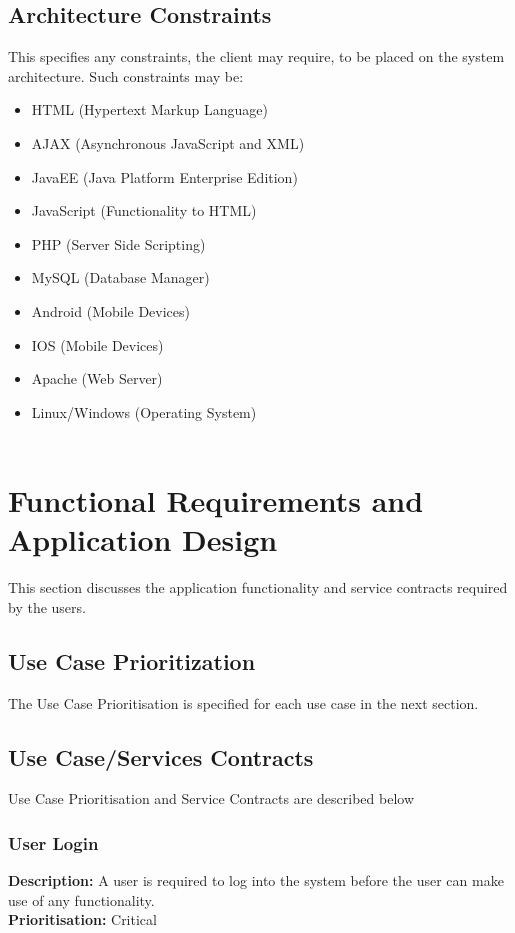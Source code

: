 \documentclass[a4paper]{article}
\begin{document}
	\subsection{Architecture Constraints}
	This specifies any constraints, the client may require, to be placed on the system architecture. Such constraints may be:
	\begin{itemize}
		\item HTML (Hypertext Markup Language)
		\item AJAX (Asynchronous JavaScript and XML)
		\item JavaEE (Java Platform Enterprise Edition)
		\item JavaScript (Functionality to HTML)
		\item PHP (Server Side Scripting)
		\item MySQL (Database Manager)
		\item Android (Mobile Devices)
		\item IOS (Mobile Devices)
		\item Apache (Web Server)
		\item Linux/Windows (Operating System)
		\\
		\\
	\end{itemize}
	\pagebreak
	\section{Functional Requirements and Application Design}
	This section discusses the application functionality and service contracts required by the users.
	\subsection{Use Case Prioritization}
	The Use Case Prioritisation is specified for each use case in the next section.
	
	\subsection{Use Case/Services Contracts}
	 Use Case Prioritisation and Service Contracts are described below
	 
	\subsubsection{User Login}
	\textbf{Description:}  A user is required to log into the system before the user can make use of any functionality.
	\\
    \textbf{Prioritisation:} Critical\\
    
\end{document}
